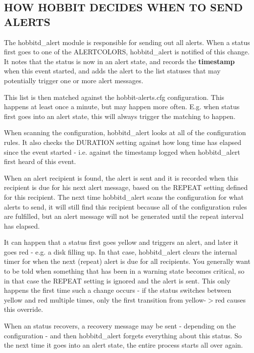 \subsection{HOW HOBBIT DECIDES WHEN TO SEND ALERTS}
 The hobbitd\_alert module is responsible for sending out all
 alerts. When a status first goes to one of the ALERTCOLORS,
 hobbitd\_alert is notified of this change. It notes that the status
 is now in an alert state, and records the \textbf{timestamp} when
 this event started, and adds the alert to the list statuses that may
 potentially trigger one or more alert messages. 


  This list is then matched against the hobbit-alerts.cfg
  configuration. This happens at least once a minute, but may happen
  more often. E.g. when status first goes into an alert state, this
  will always trigger the matching to happen. 



  When scanning the configuration, hobbitd\_alert looks at all of the
  configuration rules. It also checks the DURATION setting against how
  long time has elapsed since the event started - i.e. against the
  timestamp logged when hobbitd\_alert first heard of this event. 



  When an alert recipient is found, the alert is sent and it is
  recorded when this recipient is due for his next alert message,
  based on the REPEAT setting defined for this recipient. The next
  time hobbitd\_alert scans the configuration for what alerts to send,
  it will still find this recipient because all of the configuration
  rules are fulfilled, but an alert message will not be generated
  until the repeat interval has elapsed. 



  It can happen that a status first goes yellow and triggers an alert,
  and later it goes red - e.g. a disk filling up. In that case,
  hobbitd\_alert clears the internal timer for when the next (repeat)
  alert is due for all recipients. You generally want to be told when
  something that has been in a warning state becomes critical, so in
  that case the REPEAT setting is ignored and the alert is sent. This
  only happens the first time such a change occurs - if the status
  switches between yellow and red multiple times, only the first
  transition from yellow-$>$red causes this override. 



  When an status recovers, a recovery message may be sent - depending
  on the configuration - and then hobbitd\_alert forgets everything
  about this status. So the next time it goes into an alert state, the
  entire process starts all over again. 



